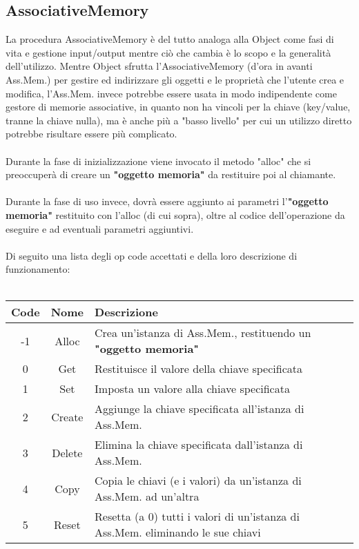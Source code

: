 \documentclass[a4paper]{article}
\begin{document}
\subsection{AssociativeMemory}
La procedura AssociativeMemory è del tutto analoga alla Object come fasi di vita e gestione input/output mentre ciò che cambia è lo scopo e la generalità dell'utilizzo. Mentre Object sfrutta l'AssociativeMemory (d'ora in avanti Ass.Mem.) per gestire ed indirizzare gli oggetti e le proprietà che l'utente crea e modifica, l'Ass.Mem. invece potrebbe essere usata in modo indipendente come gestore di memorie associative, in quanto non ha vincoli per la chiave (key/value, tranne la chiave nulla), ma è anche più a "basso livello" per cui un utilizzo diretto potrebbe risultare essere più complicato.
\\\\
Durante la fase di inizializzazione viene invocato il metodo "alloc" che si preoccuperà di creare un \textbf{"oggetto memoria"} da restituire poi al chiamante.
\\\\
Durante la fase di uso invece, dovrà essere aggiunto ai parametri l'\textbf{"oggetto memoria"} restituito con l'alloc (di cui sopra), oltre al codice dell'operazione da eseguire e ad eventuali parametri aggiuntivi.
\\\\
Di seguito una lista degli op code accettati e della loro descrizione di funzionamento:
\\\\
\begin{tabular}{ |c|c|p{12cm}| }
  \hline
  \textbf{Code} & \textbf{Nome} & \textbf{Descrizione} \\ \hline
  -1 & Alloc & Crea un'istanza di Ass.Mem., restituendo un \textbf{"oggetto memoria"} \\ \hline
   0 & Get & Restituisce il valore della chiave specificata \\ \hline
   1 & Set & Imposta un valore alla chiave specificata \\ \hline
   2 & Create & Aggiunge la chiave specificata all'istanza di Ass.Mem. \\ \hline
   3 & Delete & Elimina la chiave specificata dall'istanza di Ass.Mem. \\ \hline
   4 & Copy & Copia le chiavi (e i valori) da un'istanza di Ass.Mem. ad un'altra \\ \hline
   5 & Reset & Resetta (a 0) tutti i valori di un'istanza di Ass.Mem. eliminando le sue chiavi \\ \hline
\end{tabular}
\\
\end{document}
